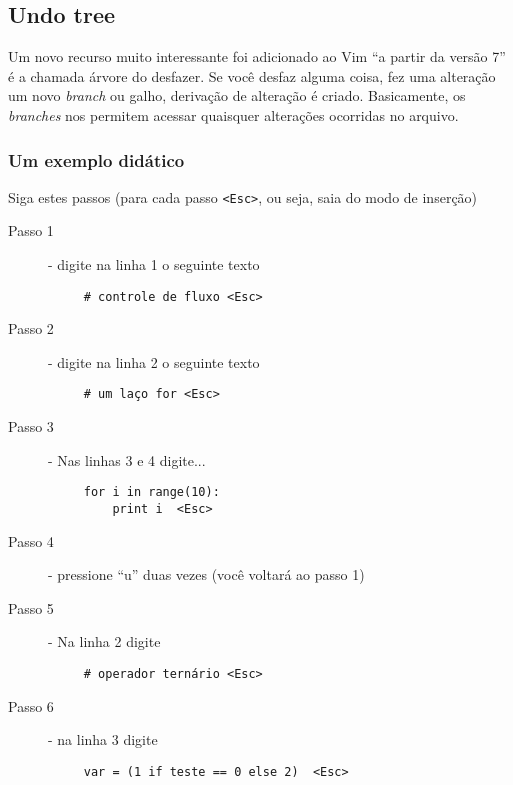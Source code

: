 \subsection{Undo tree}
\label{Undo tree}

Um novo recurso muito interessante foi adicionado ao Vim ``a partir da
versão 7''  é a chamada árvore do desfazer.  Se
você desfaz alguma coisa, fez uma alteração um novo {\em branch} ou
galho, derivação de alteração é criado.  Basicamente, os {\em branches}
nos permitem acessar quaisquer alterações ocorridas no arquivo.

\subsubsection{Um exemplo didático}
\label{Um exemplo didático}

Siga estes passos (para cada passo \verb|<Esc>|, ou seja, saia do modo
de inserção)


\begin{description}
\item [Passo 1] - digite na linha 1 o seguinte texto
\begin{verbatim}
     # controle de fluxo <Esc>
\end{verbatim}

\item [Passo 2] - digite na linha 2 o seguinte texto
\begin{verbatim}
     # um laço for <Esc>
\end{verbatim}

\item [Passo 3] - Nas linhas 3 e 4 digite...

\begin{verbatim}
     for i in range(10):
         print i  <Esc>
\end{verbatim}

\item [Passo 4] - pressione ``u'' duas vezes (você voltará ao passo 1)
\item [Passo 5] - Na linha 2 digite

\begin{verbatim}
     # operador ternário <Esc>
\end{verbatim}

\item [Passo 6] - na linha 3 digite

\begin{verbatim}
     var = (1 if teste == 0 else 2)  <Esc>
\end{verbatim}

\end{description}

